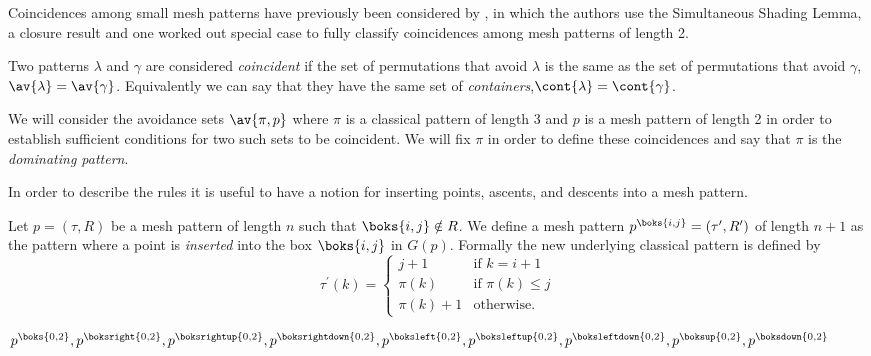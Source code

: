 Coincidences among small mesh patterns have previously been considered by 
\textcite{DBLP:journals/corr/ClaessonTU14}, in which the authors use the Simultaneous Shading Lemma,
a closure result and one worked out special case to fully classify coincidences among mesh patterns
of length 2.

Two patterns \(\lambda\) and \(\gamma\) are considered \emph{coincident} if the set of permutations
that avoid \(\lambda\) is the same as the set of permutations that avoid \(\gamma\), \ie \(\av{\lambda} = \av{\gamma}\).
Equivalently we can say that they have the same set of \emph{containers},\ie \(\cont{\lambda} = \cont{\gamma}\).

We will consider the avoidance sets \(\av{\pi,p}\) where \(\pi\) is a classical pattern of length 3
and \(p\) is a mesh pattern of length 2 in order to establish sufficient conditions for two such
sets to be coincident. We will fix \(\pi\) in order to define these coincidences and say that \(\pi\)
is the \emph{dominating pattern}.

In order to describe the rules it is useful to have a notion for inserting points, ascents, and descents
into a mesh pattern.
\begin{definition}
Let \(p=(\tau,R)\) be a mesh pattern of length \(n\) such that \(\boks{i,j}\notin R\). We define
a mesh pattern \(p^\boks{i,j} = (\tau^\prime,R^\prime)\) of length \(n+1\) as the pattern where a 
point is \emph{inserted} into the box \(\boks{i,j}\) in \(G(p)\). Formally the new underlying classical
pattern is defined by 
\begin{equation*}
\tau^\prime(k) = \begin{cases}
    j+1 & \text{if } k = i+1\\
    \pi(k) & \text{if } \pi(k)\le j\\
    \pi(k)+1 & \text{otherwise.}
\end{cases} 
\end{equation*}
\end{definition}

\(p^\boks{0,2},
p^\boksright{0,2},
p^\boksrightup{0,2},
p^\boksrightdown{0,2},
p^\boksleft{0,2},
p^\boksleftup{0,2},
p^\boksleftdown{0,2},
p^\boksup{0,2},
p^\boksdown{0,2}\) 